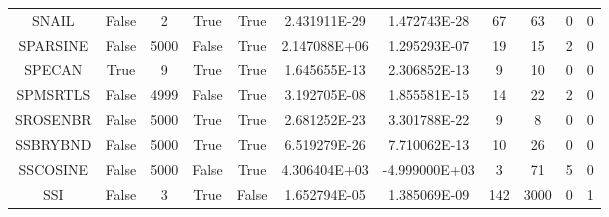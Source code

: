 \begin{longtable}{ccccccccccc}
	\cellcolor{default2} SNAIL& \cellcolor{default2} False& \cellcolor{default2} 2& \cellcolor{default2} True& \cellcolor{default2} True& \cellcolor{best} 2.431911E-29& \cellcolor{ok} 1.472743E-28& \cellcolor{ok} 67& \cellcolor{best} 63& \cellcolor{default2} 0& \cellcolor{default2} 0\\
	\cellcolor{default1} SPARSINE& \cellcolor{default1} False& \cellcolor{default1} 5000& \cellcolor{default1} False& \cellcolor{default1} True& \cellcolor{poor} 2.147088E+06& \cellcolor{best} 1.295293E-07& \cellcolor{ok} 19& \cellcolor{best} 15& \cellcolor{default1} 2& \cellcolor{default1} 0\\
	\cellcolor{default2} SPECAN& \cellcolor{default2} True& \cellcolor{default2} 9& \cellcolor{default2} True& \cellcolor{default2} True& \cellcolor{best} 1.645655E-13& \cellcolor{ok} 2.306852E-13& \cellcolor{best} 9& \cellcolor{ok} 10& \cellcolor{default2} 0& \cellcolor{default2} 0\\
	\cellcolor{default1} SPMSRTLS& \cellcolor{default1} False& \cellcolor{default1} 4999& \cellcolor{default1} False& \cellcolor{default1} True& \cellcolor{ok} 3.192705E-08& \cellcolor{best} 1.855581E-15& \cellcolor{best} 14& \cellcolor{ok} 22& \cellcolor{default1} 2& \cellcolor{default1} 0\\
	\cellcolor{default2} SROSENBR& \cellcolor{default2} False& \cellcolor{default2} 5000& \cellcolor{default2} True& \cellcolor{default2} True& \cellcolor{best} 2.681252E-23& \cellcolor{ok} 3.301788E-22& \cellcolor{ok} 9& \cellcolor{best} 8& \cellcolor{default2} 0& \cellcolor{default2} 0\\
	\cellcolor{default1} SSBRYBND& \cellcolor{default1} False& \cellcolor{default1} 5000& \cellcolor{default1} True& \cellcolor{default1} True& \cellcolor{best} 6.519279E-26& \cellcolor{ok} 7.710062E-13& \cellcolor{best} 10& \cellcolor{poor} 26& \cellcolor{default1} 0& \cellcolor{default1} 0\\
	\cellcolor{default2} SSCOSINE& \cellcolor{default2} False& \cellcolor{default2} 5000& \cellcolor{default2} False& \cellcolor{default2} True& \cellcolor{poor} 4.306404E+03& \cellcolor{best} -4.999000E+03& \cellcolor{best} 3& \cellcolor{poor} 71& \cellcolor{default2} 5& \cellcolor{default2} 0\\
	\cellcolor{default1} SSI& \cellcolor{default1} False& \cellcolor{default1} 3& \cellcolor{default1} True& \cellcolor{default1} False& \cellcolor{ok} 1.652794E-05& \cellcolor{best} 1.385069E-09& \cellcolor{best} 142& \cellcolor{poor} 3000& \cellcolor{default1} 0& \cellcolor{default1} 1\\

\end{longtable}
